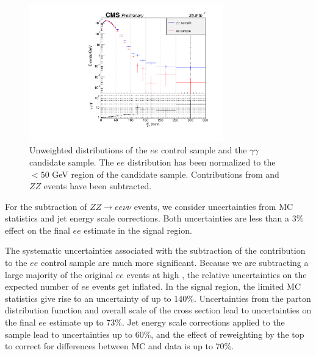 \begin{figure}[h]
\begin{center}
\includegraphics[width=0.75\textwidth]{Figures/Appendix/compare_ee_gg_unweighted.pdf}
\end{center}
\caption[Unweighted \ETmiss distributions of the $ee$ control sample and the $\gamma\gamma$ candidate sample.]
{Unweighted \ETmiss distributions of the $ee$ control sample and the $\gamma\gamma$ candidate sample.
The $ee$ distribution has been normalized to the \ETmiss$<50$ GeV region of the candidate sample. Contributions 
from \ttbar and $ZZ$ events have been subtracted.}
\label{fig:eeUnweighted}
\end{figure}


For the subtraction of $ZZ \rightarrow ee\nu\nu$ events, 
we consider uncertainties from
MC statistics and jet energy scale corrections.
Both uncertainties are less than a 3\% effect
on the final $ee$ estimate in the signal region.

The systematic uncertainties associated with 
the subtraction of the \ttbar contribution to the $ee$ control
sample are much more significant. 
Because we are subtracting a large majority of the
original $ee$ events at high \ETmiss, the relative
uncertainties on the expected number of $ee$ events get inflated.
In the signal region, the limited MC \ttbar statistics
give rise to an uncertainty of up to 140\%. Uncertainties
from the parton distribution function and overall
scale of the cross section lead to uncertainties
on the final $ee$ estimate up to 73\%.
Jet energy scale corrections
applied to the \ttbar sample lead to uncertainties up to
60\%, and the effect of reweighting by the
top \pt to correct for differences between
MC and data is up to 70\%.

